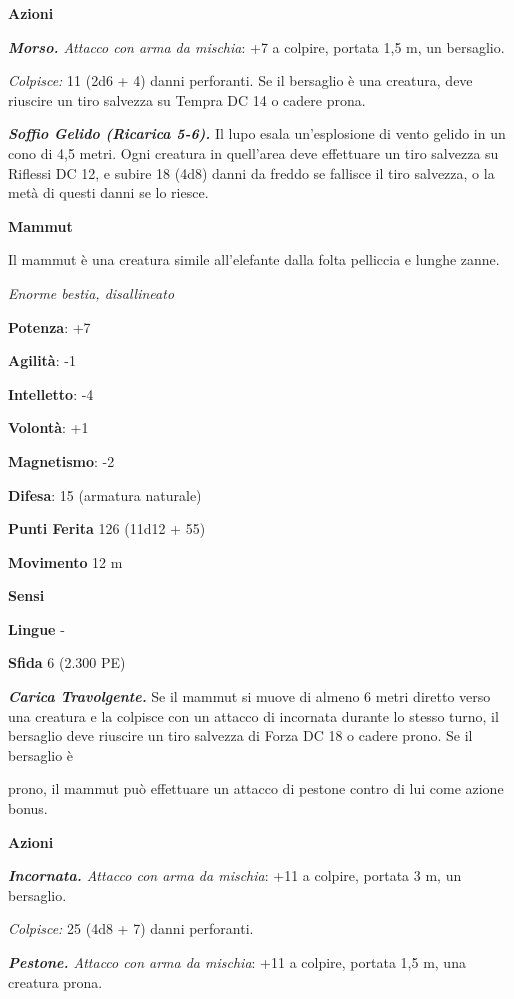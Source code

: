\begin{multicols}{2}
\textbf{Azioni}

\emph{\textbf{Morso.} Attacco con arma da mischia}: +7 a colpire,
portata 1,5 m, un bersaglio.

\emph{Colpisce:} 11 (2d6 + 4) danni perforanti. Se il bersaglio è una
creatura, deve riuscire un tiro salvezza su Tempra DC 14 o cadere prona.

\emph{\textbf{Soffio Gelido (Ricarica 5-6).}} Il lupo esala
un'esplosione di vento gelido in un cono di 4,5 metri. Ogni creatura in
quell'area deve effettuare un tiro salvezza su Riflessi DC 12, e subire
18 (4d8) danni da freddo se fallisce il tiro salvezza, o la metà di
questi danni se lo riesce.

\textbf{Mammut}

Il mammut è una creatura simile all'elefante dalla folta pelliccia e
lunghe zanne.

\emph{Enorme bestia, disallineato}

\textbf{Potenza}: +7

\textbf{Agilità}: -1

\textbf{Intelletto}: -4

\textbf{Volontà}: +1

\textbf{Magnetismo}: -2

\textbf{Difesa}: 15 (armatura naturale)

\textbf{Punti Ferita} 126 (11d12 + 55)

\textbf{Movimento} 12 m

\textbf{Sensi} 

\textbf{Lingue} -

\textbf{Sfida} 6 (2.300 PE)

\emph{\textbf{Carica Travolgente.}} Se il mammut si muove di almeno 6
metri diretto verso una creatura e la colpisce con un attacco di
incornata durante lo stesso turno, il bersaglio deve riuscire un tiro
salvezza di Forza DC 18 o cadere prono. Se il bersaglio è



prono, il mammut può effettuare un attacco di pestone contro di lui come
azione bonus.

\textbf{Azioni}

\emph{\textbf{Incornata.} Attacco con arma da mischia}: +11 a colpire,
portata 3 m, un bersaglio.

\emph{Colpisce:} 25 (4d8 + 7) danni perforanti.

\emph{\textbf{Pestone.} Attacco con arma da mischia}: +11 a colpire,
portata 1,5 m, una creatura prona.


\end{multicols}
